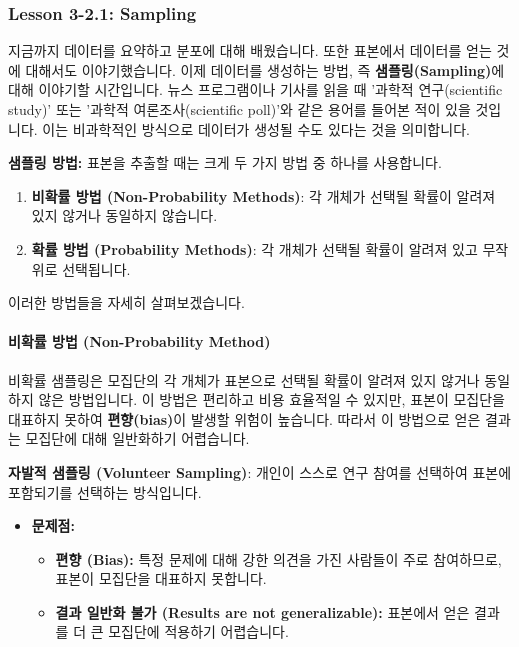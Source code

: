 \documentclass[11pt,a4paper]{book}
\newcommand{\concept}[1]{\textbf{#1}}
\theoremstyle{definition}
\begin{document}
\subsubsection{Lesson 3-2.1: Sampling}

지금까지 데이터를 요약하고 분포에 대해 배웠습니다. 또한 표본에서 데이터를 얻는 것에 대해서도 이야기했습니다. 이제 데이터를 생성하는 방법, 즉 \concept{샘플링(Sampling)}에 대해 이야기할 시간입니다. 뉴스 프로그램이나 기사를 읽을 때 '과학적 연구(scientific study)' 또는 '과학적 여론조사(scientific poll)'와 같은 용어를 들어본 적이 있을 것입니다. 이는 비과학적인 방식으로 데이터가 생성될 수도 있다는 것을 의미합니다.

\begin{tcolorbox}[summarybox]
\textbf{샘플링 방법:}
표본을 추출할 때는 크게 두 가지 방법 중 하나를 사용합니다.
\begin{enumerate}
    \item \concept{비확률 방법 (Non-Probability Methods)}: 각 개체가 선택될 확률이 알려져 있지 않거나 동일하지 않습니다.
    \item \concept{확률 방법 (Probability Methods)}: 각 개체가 선택될 확률이 알려져 있고 무작위로 선택됩니다.
\end{enumerate}
이러한 방법들을 자세히 살펴보겠습니다.
\end{tcolorbox}

\paragraph{비확률 방법 (Non-Probability Method)}
비확률 샘플링은 모집단의 각 개체가 표본으로 선택될 확률이 알려져 있지 않거나 동일하지 않은 방법입니다. 이 방법은 편리하고 비용 효율적일 수 있지만, 표본이 모집단을 대표하지 못하여 \concept{편향(bias)}이 발생할 위험이 높습니다. 따라서 이 방법으로 얻은 결과는 모집단에 대해 일반화하기 어렵습니다.

\begin{tcolorbox}[infobox, title={비확률 방법 (1/2): 자발적 샘플링 (Volunteer Sampling)}]
\concept{자발적 샘플링 (Volunteer Sampling)}: 개인이 스스로 연구 참여를 선택하여 표본에 포함되기를 선택하는 방식입니다.
\begin{itemize}
    \item \textbf{문제점:}
    \begin{itemize}
        \item \textbf{편향 (Bias):} 특정 문제에 대해 강한 의견을 가진 사람들이 주로 참여하므로, 표본이 모집단을 대표하지 못합니다.
        \item \textbf{결과 일반화 불가 (Results are not generalizable):} 표본에서 얻은 결과를 더 큰 모집단에 적용하기 어렵습니다.
    \end{itemize}
\end{itemize}
\end{tcolorbox}
\end{document}
